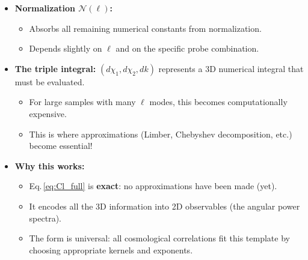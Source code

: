 \begin{itemize}[leftmargin=1.5cm]
    \item \textbf{Normalization $\mathcal{N}(\ell)$:} 
        \begin{itemize}
            \item Absorbs all remaining numerical constants from normalization.
            \item Depends slightly on $\ell$ and on the specific probe combination.
        \end{itemize}
    
    \item \textbf{The triple integral:} $(d\chi_1, d \chi_2, dk)$ represents a 3D numerical integral that must be evaluated.
        \begin{itemize}
            \item For large samples with many $\ell$ modes, this becomes computationally expensive.
            \item This is where approximations (Limber, Chebyshev decomposition, etc.) become essential!
        \end{itemize}
    
    \item \textbf{Why this works:}
        \begin{itemize}
            \item Eq.\,\eqref{eq:Cl_full} is \textbf{exact}: no approximations have been made (yet).
            \item It encodes all the 3D information into 2D observables (the angular power spectra).
            \item The form is universal: all cosmological correlations fit this template by choosing appropriate kernels and exponents.
        \end{itemize}
\end{itemize}


